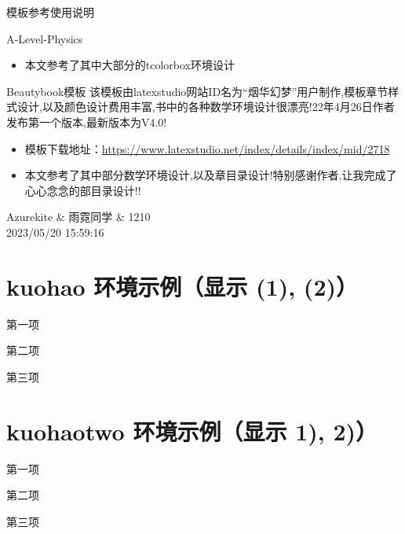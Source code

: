 \begin{ascolorbox5}{模板参考使用说明}
\begin{ascboxB}{A-Level-Physics}
\begin{itemize}
			\item 本文参考了其中大部分的tcolorbox环境设计
		\end{itemize} 	
	\end{ascboxB}
	\begin{ascboxB}{Beautybook模板}
		该模板由latexstudio网站ID名为“烟华幻梦”用户制作,模板章节样式设计,以及颜色设计费用丰富,书中的各种数学环境设计很漂亮!22年4月26日作者发布第一个版本,最新版本为V4.0!
		\begin{itemize}
			\item 模板下载地址：\href{https://www.latexstudio.net/index/details/index/mid/2718}{https://www.latexstudio.net/index/details/index/mid/2718}
			\item 本文参考了其中部分数学环境设计,以及章目录设计!特别感谢作者,让我完成了心心念念的部目录设计!!
		\end{itemize} 	
	\end{ascboxB}
\end{ascolorbox5}
\begin{flushright}
	Azurekite \& 雨霓同学 \& 1210 \\
	2023/05/20 15:59:16
\end{flushright}


\section*{kuohao 环境示例（显示 (1), (2)）}
\begin{kuohao}
	\item 第一项
	\item 第二项
	\item 第三项
\end{kuohao}

\section*{kuohaotwo 环境示例（显示 1), 2)）}
\begin{kuohaotwo}
	\item 第一项
	\item 第二项
	\item 第三项
\end{kuohaotwo}

\frontmatter